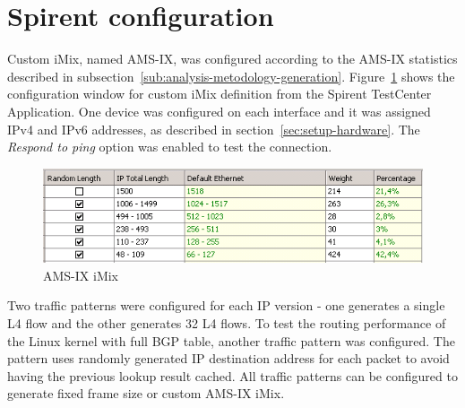 
\section{Spirent configuration}\label{sec:setup-spirent}
Custom iMix, named AMS-IX, was configured according to the AMS-IX statistics described in
subsection~\ref{sub:analysis-metodology-generation}.
Figure~\ref{fig:setup-amsix-imix} shows the configuration window for custom iMix definition
from the Spirent TestCenter Application.
One device was configured on each interface and it was assigned IPv4 and IPv6 addresses, as described in section~\ref{sec:setup-hardware}.
The {\it{Respond to ping}} option was enabled to test the connection.

\begin{figure}
	\centering
	\includegraphics[width=14.5cm,keepaspectratio]{fig/amsix-imix.png}
	\caption{AMS-IX iMix}
	\label{fig:setup-amsix-imix}
\end{figure}

Two traffic patterns were configured for each IP version - one generates a single L4 flow and the other
generates 32 L4 flows.
To test the routing performance of the Linux kernel with full BGP table, 
another traffic pattern was configured.
The pattern uses randomly generated IP destination address for each packet
to avoid having the previous lookup result cached.
All traffic patterns can be configured to generate fixed frame size or custom AMS-IX iMix.
